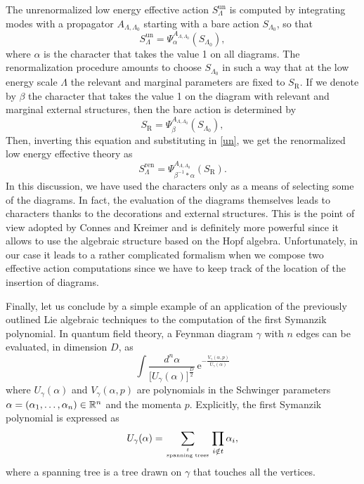 \documentclass[12pt,here,feynmf]{article}
\begin{document}
The unrenormalized low energy effective action $S_{\Lambda}^{\mathrm{un}}$ is computed by integrating modes with a propagator $A_{\Lambda,\Lambda_{0}}$ starting with a bare action $S_{\Lambda_{0}}$, so that
\begin{equation} 
S_{\Lambda}^{\mathrm{un}}=\Psi_{\alpha}^{A_{\Lambda,\Lambda_{0}}}(S_{\Lambda_{0}}),\label{un}
\end{equation}  
where $\alpha$ is the character that takes the value 1 on all diagrams. The renormalization procedure amounts to choose $S_{\Lambda_{0}}$ in such a way that at the low energy scale $\Lambda$ the relevant and marginal parameters are fixed to $S_{\mathrm{R}}$. If we denote by $\beta$ the character that takes the value 1 on the diagram with relevant and marginal external structures, then the bare action is determined by
\begin{equation} 
S_{\mathrm{R}}=\Psi_{\beta}^{A_{\Lambda,\Lambda_{0}}}(S_{\Lambda_{0}}),
\end{equation}  
Then, inverting this equation and substituting in \eqref{un}, we get the renormalized low energy effective theory as
\begin{equation} 
S_{\Lambda}^{\mathrm{ren}}=\Psi_{\beta^{-1}\ast\alpha}^{A_{\Lambda,\Lambda_{0}}}(S_{\mathrm{R}}).
\end{equation}  
In this discussion, we have used the characters only as a means of selecting some of the diagrams. In fact, the evaluation of the diagrams themselves leads to characters thanks to the decorations and external structures. This is the point of view adopted by Connes and Kreimer and is definitely more powerful since it allows to use the algebraic structure based on the Hopf algebra. Unfortunately, in our case it leads to a rather complicated formalism when we compose two effective action computations since we have to keep track of the location of the insertion of diagrams. 

Finally, let us conclude by a simple example of an application of the previously outlined Lie algebraic techniques to the computation of the first Symanzik polynomial. In quantum field theory, a Feynman diagram $\gamma$ with $n$ edges can be evaluated, in dimension $D$, as
\begin{equation}
\int \frac{d^{n}\alpha}{\big[\textstyle{U_{\gamma}(\alpha)}\big]^{\frac{D}{2}}}\,\mathrm{e}^{-\frac{V_{\gamma}(\alpha,p)}{U_{\gamma}(\alpha)}}
\end{equation}
where $U_{\gamma}(\alpha)$ and $V_{\gamma}(\alpha,p)$ are polynomials in the Schwinger parameters $\alpha=(\alpha_{1},\dots,\alpha_{n})\in{\Bbb R}^{n}$ and the momenta $p$. Explicitly, the first Symanzik polynomial is expressed as 
\begin{equation}
U_{\gamma}(\alpha)=\sum_{t\atop \mbox{\tiny spanning trees}}\prod_{i\notin t}\alpha_{i},
\end{equation}
where a spanning tree is a tree drawn on $\gamma$ that touches all the vertices.
\end{document}
